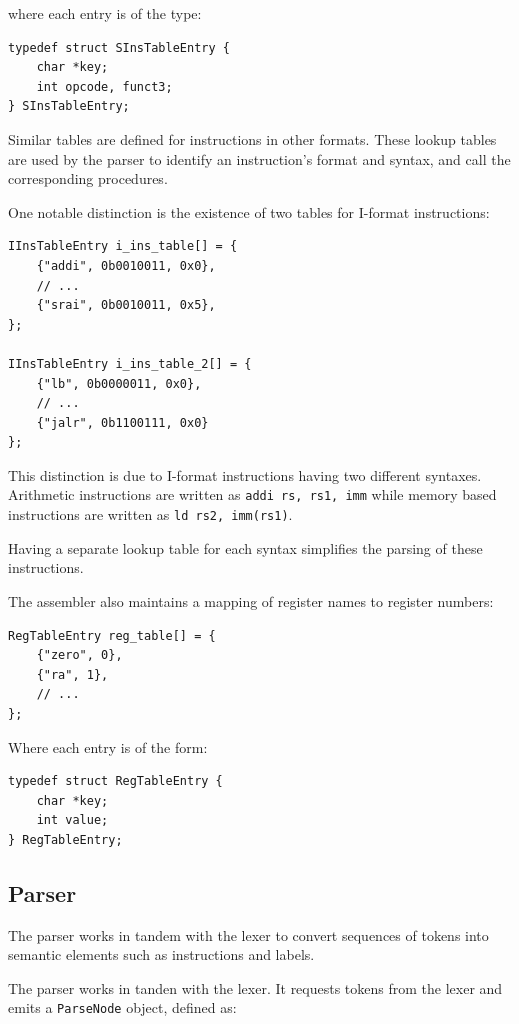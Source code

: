 \documentclass{article}
\begin{document}
where each entry is of the type:

\begin{verbatim}
typedef struct SInsTableEntry {
    char *key;
    int opcode, funct3;
} SInsTableEntry;    
\end{verbatim}

Similar tables are defined for instructions in other formats. These
lookup tables are used by the parser to identify an instruction's
format and syntax, and call the corresponding procedures.

One notable distinction is the existence of two tables for I-format
instructions:

\begin{verbatim}
IInsTableEntry i_ins_table[] = {
    {"addi", 0b0010011, 0x0},
    // ...
    {"srai", 0b0010011, 0x5},
};

IInsTableEntry i_ins_table_2[] = {
    {"lb", 0b0000011, 0x0},
    // ...
    {"jalr", 0b1100111, 0x0}
};
\end{verbatim}

This distinction is due to I-format instructions having two different syntaxes.
Arithmetic instructions are written as \texttt{addi rs, rs1, imm} while memory
based instructions are written as \texttt{ld rs2, imm(rs1)}.

Having a separate lookup table for each syntax simplifies the parsing of these
instructions.

The assembler also maintains a mapping of register names to register numbers:

\begin{verbatim}
RegTableEntry reg_table[] = {
    {"zero", 0},
    {"ra", 1},
    // ...
};
\end{verbatim}

Where each entry is of the form:

\begin{verbatim}
typedef struct RegTableEntry {
    char *key;
    int value;
} RegTableEntry;
\end{verbatim}

\subsection{Parser}

The parser works in tandem with the lexer to convert sequences of tokens
into semantic elements such as instructions and labels.

The parser works in tanden with the lexer. It requests tokens from the
lexer and emits a \texttt{ParseNode} object, defined as:
\end{document}
